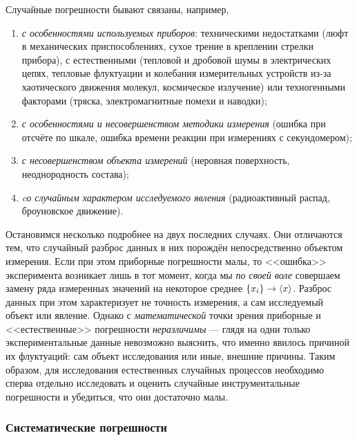 Случайные погрешности бывают связаны, например,
\begin{enumerate}

    \item \emph{с особенностями используемых приборов}: техническими
недостатками
(люфт в механических приспособлениях, сухое трение в креплении стрелки
прибора), с естественными (тепловой и дробовой шумы в электрических
цепях, тепловые флуктуации и колебания измерительных устройств из-за
хаотического движения молекул, космическое излучение) или техногенными
факторами (тряска, электромагнитные помехи и наводки);

    \item \emph{с особенностями и несовершенством методики измерения} (ошибка
при отсчёте по шкале, ошибка времени реакции при измерениях с секундомером);

    \item \emph{с несовершенством объекта измерений} (неровная поверхность,
неоднородность состава);

    \item \emph{cо случайным характером исследуемого явления} (радиоактивный
распад, броуновское движение).

\end{enumerate}

Остановимся несколько подробнее на двух последних случаях. Они отличаются
тем, что случайный разброс данных в них порождён непосредственно объектом
измерения. Если при этом приборные погрешности малы, то <<ошибка>>
эксперимента возникает лишь в тот момент, когда мы \emph{по своей
воле} совершаем замену ряда измеренных значений на некоторое среднее
$\left\{ x_{i}\right\} \to\left<x\right>$. Разброс данных при этом
характеризует не точность измерения, а сам исследуемый объект или
явление. Однако с \emph{математической} точки зрения приборные и
<<естественные>>
погрешности \emph{неразличимы} --- глядя на одни только
экспериментальные данные невозможно выяснить, что именно явилось причиной
их флуктуаций: сам объект исследования или иные, внешние причины.
Таким образом, для исследования естественных случайных процессов необходимо
сперва отдельно исследовать и оценить случайные инструментальные погрешности
и убедиться, что они достаточно малы.


\subsubsection{Систематические погрешности}

